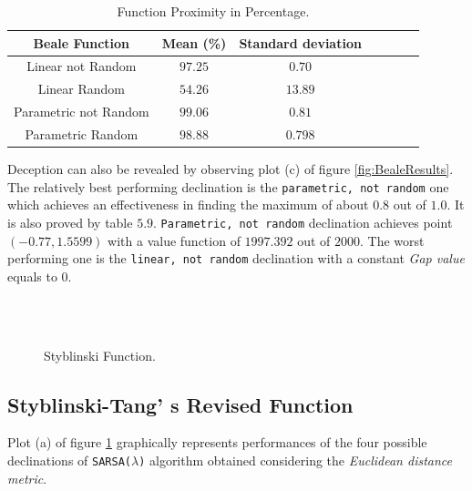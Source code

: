 \begin{table}[h!]
	\centering
	\resizebox{\linewidth}{!} {
		\begin{tabular}{c| cccccc} 
			\hline \textbf{Beale Function}
			& \textbf{Mean (\%)} & \textbf{Standard deviation} \\ 
			\hline Linear not Random
			& $97.25$ & \cellcolor{green!25}$0.70$\\ 
			\hline Linear Random
			& $54.26$ & $13.89$\\ 
			\hline Parametric not Random
			& \cellcolor{green!25}$99.06$ & $0.81$ \\ 
			\hline Parametric Random
			& $98.88$ & $0.798$ \\ 
			\hline 
		\end{tabular} 
}
	\caption{Function Proximity in Percentage.} 
	\label{BealeTabProximity}
\end{table}

Deception can also be revealed by observing plot (c) of figure \ref{fig:BealeResults}. The relatively best performing declination is the {\tt parametric, not random} one which achieves an effectiveness in finding the maximum of about $0.8$ out of $1.0$. It is also proved by table $5.9$. {\tt Parametric, not random} declination achieves point $(-0.77, 1.5599)$ with a value function of $1997.392$ out of $2000$. The worst performing one is the {\tt linear, not random} declination with a constant \textit{Gap value} equals to $0$.

\begin{figure}[h!]
	\begin{center}
		\\
		 \\
		
	\end{center}
	\caption{
		Styblinski Function.
	}
	\label{fig:StyblinskiResults}
\end{figure}

\subsection{Styblinski-Tang' s Revised Function} Plot (a) of figure \ref{fig:StyblinskiResults} graphically represents performances of the four possible declinations of {\tt SARSA($\lambda$)} algorithm obtained considering the \textit{Euclidean distance metric}. 

